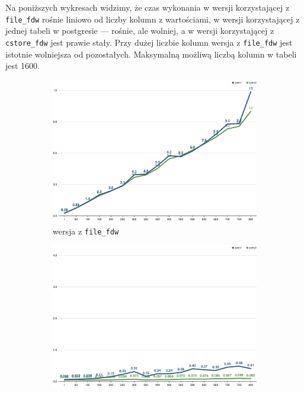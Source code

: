 \documentclass[a4paper,11pt]{article}
\begin{document}
Na poniższych wykresach widzimy, że czas wykonania w wersji korzystającej z \texttt{file\_fdw} rośnie liniowo od liczby kolumn z wartościami,
w wersji korzystającej z jednej tabeli w postgresie --- rośnie, ale wolniej, a w wersji korzystającej z \texttt{cstore\_fdw} jest
prawie stały. Przy dużej liczbie kolumn wersja z \texttt{file\_fdw} jest istotnie wolniejsza od pozostałych.
Maksymalną możliwą liczbą kolumn w tabeli jest 1600.
\begin{figure}[h!]
    \centering
    \begin{subfigure}{.49\textwidth}
        \centering
        \includegraphics[width=\textwidth]{charts/execution-time-file-fdw-number_of_values}
        \caption{wersja z \texttt{file\_fdw}}
    \end{subfigure}
    \hfill
    \begin{subfigure}{.49\textwidth}
        \centering
        \includegraphics[width=\textwidth]{charts/execution-time-sql-one-table-number_of_values}

\end{subfigure}
\end{figure}
\end{document}
